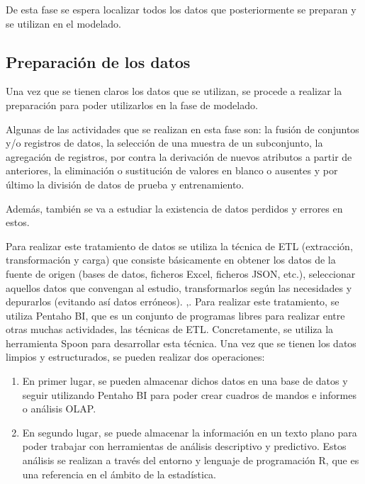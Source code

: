 De esta fase se espera localizar todos los datos que posteriormente se preparan y se utilizan en el modelado.

\subsection{Preparación de los datos}
Una vez que se tienen claros los datos que se utilizan, se procede a realizar la preparación para poder utilizarlos en la fase de modelado.

Algunas de las actividades que se realizan en esta fase son: la fusión de conjuntos y/o registros de datos, la selección de una muestra de un subconjunto, la agregación de registros, por contra la derivación de nuevos atributos a partir de anteriores, la eliminación o sustitución de valores en blanco o ausentes y por último la división de datos de prueba y entrenamiento.

Además, también se va a estudiar la existencia de datos perdidos y errores en estos.

Para realizar este tratamiento de datos se utiliza la técnica de ETL (extracción, transformación y carga) que consiste básicamente en obtener los datos de la fuente de origen (bases de datos, ficheros Excel, ficheros JSON, etc.), seleccionar aquellos datos que convengan al estudio, transformarlos según las necesidades y depurarlos (evitando así datos erróneos). \cite{prakash2017etl} \cite{matos2006metodologia},\cite{gour2010improve}.
Para realizar este tratamiento, se utiliza Pentaho BI, que es un conjunto de programas libres para realizar entre otras muchas actividades, las técnicas de ETL. Concretamente, se utiliza la herramienta Spoon para desarrollar esta técnica. 
Una vez que se tienen los datos limpios y estructurados, se pueden realizar dos operaciones:

\begin{enumerate}
	\item  En primer lugar, se pueden almacenar dichos datos en una base de datos y seguir utilizando Pentaho BI para poder crear cuadros de mandos e informes o análisis OLAP. 
	
	\item  En segundo lugar, se puede almacenar la información en un texto plano para poder trabajar con herramientas de análisis descriptivo y predictivo. Estos análisis se realizan a través del entorno y lenguaje de programación R, que es una referencia en el ámbito de la estadística.
\end{enumerate}

